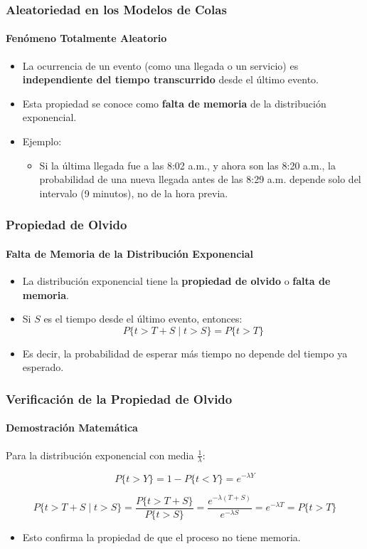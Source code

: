 \documentclass{beamer}
\begin{document}
\begin{frame}
\frametitle{Aleatoriedad en los Modelos de Colas}
\framesubtitle{Fenómeno Totalmente Aleatorio}

\begin{itemize}
    \item La ocurrencia de un evento (como una llegada o un servicio) es \textbf{independiente del tiempo transcurrido} desde el último evento.
    \item Esta propiedad se conoce como \textbf{falta de memoria} de la distribución exponencial.
    \item Ejemplo:
    \begin{itemize}
        \item Si la última llegada fue a las 8:02 a.m., y ahora son las 8:20 a.m., la probabilidad de una nueva llegada antes de las 8:29 a.m. depende solo del intervalo (9 minutos), no de la hora previa.
    \end{itemize}
\end{itemize}
\end{frame}

\begin{frame}
\frametitle{Propiedad de Olvido}
\framesubtitle{Falta de Memoria de la Distribución Exponencial}

\begin{itemize}
    \item La distribución exponencial tiene la \textbf{propiedad de olvido} o \textbf{falta de memoria}.
    \item Si $S$ es el tiempo desde el último evento, entonces:
    \[
    P\{t > T + S \mid t > S\} = P\{t > T\}
    \]
    \item Es decir, la probabilidad de esperar más tiempo no depende del tiempo ya esperado.
\end{itemize}
\end{frame}

\begin{frame}
\frametitle{Verificación de la Propiedad de Olvido}
\framesubtitle{Demostración Matemática}

Para la distribución exponencial con media $\frac{1}{\lambda}$:

\[
P\{t > Y\} = 1 - P\{t < Y\} = e^{-\lambda Y}
\]

\[
P\{t > T + S \mid t > S\} = \frac{P\{t > T + S\}}{P\{t > S\}} = 
\frac{e^{-\lambda (T + S)}}{e^{-\lambda S}} = e^{-\lambda T} = P\{t > T\}
\]

\begin{itemize}
    \item Esto confirma la propiedad de que el proceso no tiene memoria.
\end{itemize}
\end{frame}
\end{document}
